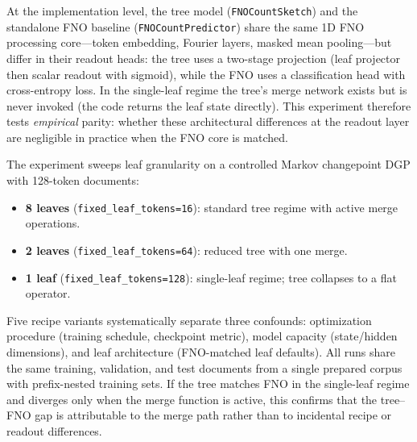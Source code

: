 At the implementation level, the tree model (\texttt{FNOCountSketch}) and the standalone FNO baseline (\texttt{FNOCountPredictor}) share the same 1D FNO processing core---token embedding, Fourier layers, masked mean pooling---but differ in their readout heads: the tree uses a two-stage projection (leaf projector then scalar readout with sigmoid), while the FNO uses a classification head with cross-entropy loss. In the single-leaf regime the tree's merge network exists but is never invoked (the code returns the leaf state directly). This experiment therefore tests \emph{empirical} parity: whether these architectural differences at the readout layer are negligible in practice when the FNO core is matched.

The experiment sweeps leaf granularity on a controlled Markov changepoint DGP with 128-token documents:
\begin{itemize}[leftmargin=1.5em]
    \item \textbf{8 leaves} (\texttt{fixed\_leaf\_tokens=16}): standard tree regime with active merge operations.
    \item \textbf{2 leaves} (\texttt{fixed\_leaf\_tokens=64}): reduced tree with one merge.
    \item \textbf{1 leaf} (\texttt{fixed\_leaf\_tokens=128}): single-leaf regime; tree collapses to a flat operator.
\end{itemize}
Five recipe variants systematically separate three confounds: optimization procedure (training schedule, checkpoint metric), model capacity (state/hidden dimensions), and leaf architecture (FNO-matched leaf defaults). All runs share the same training, validation, and test documents from a single prepared corpus with prefix-nested training sets. If the tree matches FNO in the single-leaf regime and diverges only when the merge function is active, this confirms that the tree--FNO gap is attributable to the merge path rather than to incidental recipe or readout differences.
